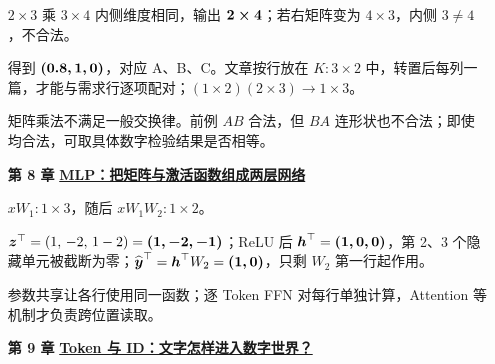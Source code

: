 \begin{enumerate}[leftmargin=5.4em,labelsep=.7em,itemsep=9pt]
$2\times3$ 乘 $3\times4$ 内侧维度相同，输出 $\answerresult{2\times4}$；若右矩阵变为 $4\times3$，内侧 $3\ne4$，不合法。
\par{}得到 $\answerresult{(0.8,1,0)}$，对应 A、B、C。文章按行放在 $K:3\times2$ 中，转置后每列一篇，才能与需求行逐项配对；$(1\times2)(2\times3)\to1\times3$。
\par{}矩阵乘法不满足一般交换律。前例 $AB$ 合法，但 $BA$ 连形状也不合法；即使均合法，可取具体数字检验结果是否相等。
\par{}
\item[\textbf{第 8 章}] \label{answer:mlp}\textbf{\hyperref[check:mlp]{MLP：把矩阵与激活函数组成两层网络}}\par\nobreak
{}
$xW_1:1\times3$，随后 $xW_1W_2:1\times2$。
\par{}$\boldsymbol{z}^\top=(1,\,-2,\,1-2)=\boldsymbol{(1,-2,-1)}$；ReLU 后 $\boldsymbol{h}^\top=\boldsymbol{(1,0,0)}$，第 2、3 个隐藏单元被截断为零；$\widehat{\boldsymbol{y}}^\top=\boldsymbol{h}^\top W_2=\boldsymbol{(1,0)}$，只剩 $W_2$ 第一行起作用。
\par{}参数共享让各行使用同一函数；逐 Token FFN 对每行单独计算，Attention 等机制才负责跨位置读取。
\par{}
\item[\textbf{第 9 章}] \label{answer:tokenization}\textbf{\hyperref[check:tokenization]{Token 与 ID：文字怎样进入数字世界？}}\par\nobreak

\end{enumerate}
